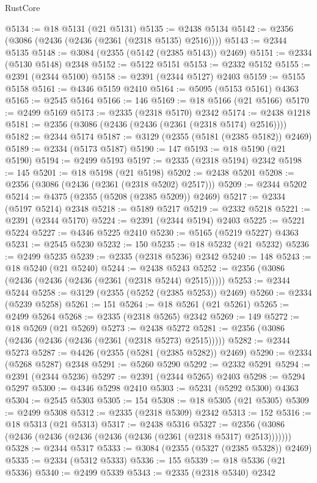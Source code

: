 \begin{lexlean}{RustCore}
\begin{coremodule}
@5134 := @18 @5131 (@21 @5131)
@5135 := @2438 @5134
@5142 := @2356 (@3086 (@2436 (@2436 (@2361 (@2318 @5135) @2516))))
@5143 := @2344 @5135
@5148 := @3084 (@2355 (@5142 (@2385 @5143)) @2469)
@5151 := @2334 (@5130 @5148) @2348
@5152 := @5122 @5151
@5153 := @2332 @5152
@5155 := @2391 (@2344 @5100)
@5158 := @2391 (@2344 @5127) @2403
@5159 := @5155 @5158
@5161 := @4346 @5159 @2410
@5164 := @5095 (@5153 @5161) @4363
@5165 := @2545 @5164
@5166 := 146
@5169 := @18 @5166 (@21 @5166)
@5170 := @2499 @5169
@5173 := @2335 (@2318 @5170) @2342
@5174 := @2438 @1218
@5181 := @2356 (@3086 (@2436 (@2436 (@2361 (@2318 @5174) @2516))))
@5182 := @2344 @5174
@5187 := @3129 (@2355 (@5181 (@2385 @5182)) @2469)
@5189 := @2334 (@5173 @5187)
@5190 := 147
@5193 := @18 @5190 (@21 @5190)
@5194 := @2499 @5193
@5197 := @2335 (@2318 @5194) @2342
@5198 := 145
@5201 := @18 @5198 (@21 @5198)
@5202 := @2438 @5201
@5208 := @2356 (@3086 (@2436 (@2361 (@2318 @5202) @2517)))
@5209 := @2344 @5202
@5214 := @4375 (@2355 (@5208 (@2385 @5209)) @2469)
@5217 := @2334 (@5197 @5214) @2348
@5218 := @5189 @5217
@5219 := @2332 @5218
@5221 := @2391 (@2344 @5170)
@5224 := @2391 (@2344 @5194) @2403
@5225 := @5221 @5224
@5227 := @4346 @5225 @2410
@5230 := @5165 (@5219 @5227) @4363
@5231 := @2545 @5230
@5232 := 150
@5235 := @18 @5232 (@21 @5232)
@5236 := @2499 @5235
@5239 := @2335 (@2318 @5236) @2342
@5240 := 148
@5243 := @18 @5240 (@21 @5240)
@5244 := @2438 @5243
@5252 := @2356 (@3086 (@2436 (@2436 (@2436 (@2361 (@2318 @5244) @2515)))))
@5253 := @2344 @5244
@5258 := @3129 (@2355 (@5252 (@2385 @5253)) @2469)
@5260 := @2334 (@5239 @5258)
@5261 := 151
@5264 := @18 @5261 (@21 @5261)
@5265 := @2499 @5264
@5268 := @2335 (@2318 @5265) @2342
@5269 := 149
@5272 := @18 @5269 (@21 @5269)
@5273 := @2438 @5272
@5281 := @2356 (@3086 (@2436 (@2436 (@2436 (@2361 (@2318 @5273) @2515)))))
@5282 := @2344 @5273
@5287 := @4426 (@2355 (@5281 (@2385 @5282)) @2469)
@5290 := @2334 (@5268 @5287) @2348
@5291 := @5260 @5290
@5292 := @2332 @5291
@5294 := @2391 (@2344 @5236)
@5297 := @2391 (@2344 @5265) @2403
@5298 := @5294 @5297
@5300 := @4346 @5298 @2410
@5303 := @5231 (@5292 @5300) @4363
@5304 := @2545 @5303
@5305 := 154
@5308 := @18 @5305 (@21 @5305)
@5309 := @2499 @5308
@5312 := @2335 (@2318 @5309) @2342
@5313 := 152
@5316 := @18 @5313 (@21 @5313)
@5317 := @2438 @5316
@5327 := @2356 (@3086 (@2436 (@2436 (@2436 (@2436 (@2436 (@2361 (@2318 @5317) @2513)))))))
@5328 := @2344 @5317
@5333 := @3084 (@2355 (@5327 (@2385 @5328)) @2469)
@5335 := @2334 (@5312 @5333)
@5336 := 155
@5339 := @18 @5336 (@21 @5336)
@5340 := @2499 @5339
@5343 := @2335 (@2318 @5340) @2342

\end{coremodule}
\end{lexlean}
